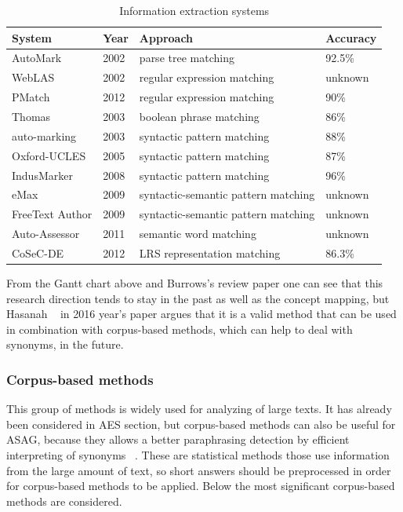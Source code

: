 \begin{table}[h!]
\centering
\caption{Information extraction systems}
\label{IE}
\begin{tabular}{|l|l|l|l|}
\hline
 System & Year & Approach & Accuracy \\ \hline
 AutoMark & 2002  & parse tree matching & 92.5\% \\ \hline
 WebLAS & 2002  & regular expression matching  & unknown \\ \hline
 PMatch & 2012  & regular expression matching & 90\%  \\ \hline
 Thomas & 2003  & boolean phrase matching & 86\% \\ \hline
 auto-marking & 2003  & syntactic pattern matching &  88\% \\ \hline
 Oxford-UCLES & 2005  & syntactic pattern matching &  87\% \\ \hline
 IndusMarker & 2008  & syntactic pattern matching & 96\% \\ \hline
 eMax & 2009  & syntactic-semantic pattern matching &  unknown \\ \hline
 FreeText Author & 2009  & syntactic-semantic pattern matching &  unknown \\ \hline
 Auto-Assessor & 2011  & semantic word matching  &  unknown \\ \hline
 CoSeC-DE & 2012 & LRS representation matching &  86.3\% \\ \hline
\end{tabular}
\end{table}

From the Gantt chart above and Burrows's review paper one can see that this research direction tends to stay in the past as well as the concept mapping, but Hasanah ~\cite{Hasanah} in 2016 year's paper argues that it is a valid method that can be used in combination with corpus-based methods, which can help to deal with synonyms, in the future.

\subsubsection{Corpus-based methods}

This group of methods is widely used for analyzing of large texts. It has already been considered in AES section, but corpus-based methods can also be useful for ASAG, because they allows a better paraphrasing detection by efficient interpreting of synonyms ~\cite{Burrows}. These are statistical methods those use information from the large amount of text, so short answers should be preprocessed in order for corpus-based methods to be applied. Below the most significant corpus-based methods are considered.\\

